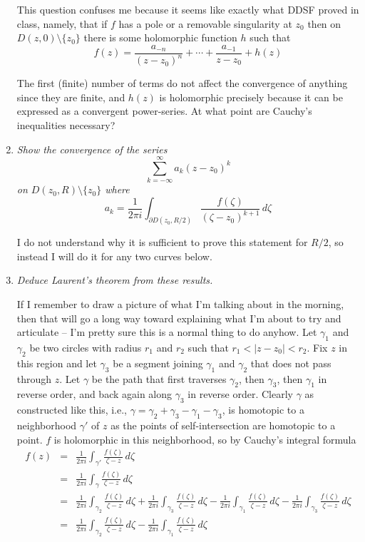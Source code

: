\documentclass[letterpaper, 11pt]{article}
\begin{document}
\begin{enumerate}
This question confuses me because it seems like exactly what DDSF proved in class, namely, that if $f$ has a pole or a removable singularity at $z_0$ then on $D(z,0) \setminus \{z_0\}$ there is some holomorphic function $h$ such that
\[
f(z) = \frac{a_{-n}}{(z-z_0)^n} + \cdots + \frac{a_{-1}}{z-z_0} + h(z)
\]

The first (finite) number of terms do not affect the convergence of anything since they are finite, and $h(z)$ is holomorphic precisely because it can be expressed as a convergent power-series.  At what point are Cauchy's inequalities necessary?

\item \emph{Show the convergence of the series $$\sum_{k=-\infty}^\infty a_k(z-z_0)^k$$ on $D(z_0, R) \setminus \{z_0\}$ where $$a_k = \frac{1}{2\pi i}\int_{\partial D(z_0, R/2)} \frac{f(\zeta)}{(\zeta-z_0)^{k+1}} \,d\zeta$$}

I do not understand why it is sufficient to prove this statement for $R/2$, so instead I will do it for any two curves below.

\item \emph{Deduce Laurent's theorem from these results.}

If I remember to draw a picture of what I'm talking about in the morning, then that will go a long way toward explaining what I'm about to try and articulate -- I'm pretty sure this is a normal thing to do anyhow.  Let $\gamma_1$ and $\gamma_2$ be two circles with radius $r_1$ and $r_2$ such that $r_1 < |z-z_0| < r_2$.  Fix $z$ in this region and let $\gamma_3$ be a segment joining $\gamma_1$ and $\gamma_2$ that does not pass through $z$.  Let $\gamma$ be the path that first traverses $\gamma_2$, then $\gamma_3$, then $\gamma_1$ in reverse order, and back again along $\gamma_3$ in reverse order.  Clearly $\gamma$ as constructed like this, i.e., $\gamma = \gamma_2 + \gamma_3 - \gamma_1 - \gamma_3$, is homotopic to a neighborhood $\gamma'$ of $z$ as the points of self-intersection are homotopic to a point.  $f$ is holomorphic in this neighborhood, so by Cauchy's integral formula
\begin{eqnarray*}
f(z) &=& \frac{1}{2\pi i} \int_{\gamma'} \frac{f(\zeta)}{\zeta-z}\,d\zeta \\
&=& \frac{1}{2\pi i} \int_{\gamma} \frac{f(\zeta)}{\zeta-z}\,d\zeta \\
&=& \frac{1}{2\pi i} \int_{\gamma_2} \frac{f(\zeta)}{\zeta-z}\,d\zeta + \frac{1}{2\pi i} \int_{\gamma_3} \frac{f(\zeta)}{\zeta-z}\,d\zeta - \frac{1}{2\pi i} \int_{\gamma_1} \frac{f(\zeta)}{\zeta-z}\,d\zeta - \frac{1}{2\pi i} \int_{\gamma_3} \frac{f(\zeta)}{\zeta-z}\,d\zeta \\
&=& \frac{1}{2\pi i} \int_{\gamma_2} \frac{f(\zeta)}{\zeta-z}\,d\zeta - \frac{1}{2\pi i} \int_{\gamma_1} \frac{f(\zeta)}{\zeta-z}\,d\zeta
\end{eqnarray*}


\end{enumerate}
\end{document}
